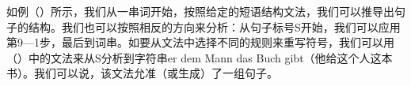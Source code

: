 \z
如例（）所示，我们从一串词开始，按照给定的短语结构文法，我们可以推导出句子的结构。我们也可以按照相反的方向来分析：从句子标号S开始，我们可以应用第9—1步，最后到词串。如要从文法中选择不同的规则来重写符号，我们可以用（）中的文法来从S分析到字符串er dem Mann das Buch gibt（他给这个人这本书）。我们可以说，该文法允准（或生成）\label{Seite-generiert}了一组句子。

